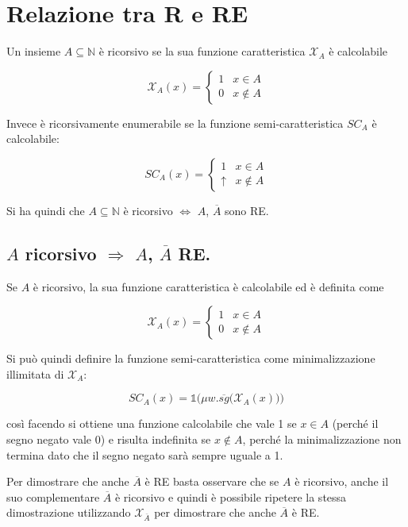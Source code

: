 \section{Relazione tra R e RE}

Un insieme $A \subseteq \mathbb{N}$ è ricorsivo se la sua funzione caratteristica $\mathcal{X}_A$ è calcolabile

$$
\mathcal{X}_A(x) = \begin{cases}
1 &x \in A \\
0 &x \notin A
\end{cases} 
$$

Invece è ricorsivamente enumerabile se la funzione semi-caratteristica $SC_A$ è calcolabile:

$$
SC_A(x) = \begin{cases}
1 &x \in A \\
\uparrow &x \notin A
\end{cases} 
$$

Si ha quindi che $A \subseteq \mathbb{N}$ è ricorsivo $\Leftrightarrow$ $A$, $\overline{A}$ sono RE.

\subsection{$A$ ricorsivo $\Rightarrow$ $A$, $\overline{A}$ RE. }

Se $A$ è ricorsivo, la sua funzione caratteristica è calcolabile ed è definita come

$$
\mathcal{X}_A(x) = \begin{cases}
1 &x \in A \\
0 &x \notin A
\end{cases} 
$$

Si può quindi definire la funzione semi-caratteristica come minimalizzazione illimitata di $\mathcal{X}_A$:

$$
SC_A(x) = \mathbb{1} \Bigg( \mu w. \overline{sg} \Big( \mathcal{X}_A(x) \Big) \Bigg)
$$

così facendo si ottiene una funzione calcolabile che vale 1 se $x \in A$ (perché il segno negato vale 0) e risulta indefinita se $x \notin A$, perché la minimalizzazione non termina dato che il segno negato sarà sempre uguale a 1.

Per dimostrare che anche $\overline{A}$ è RE basta osservare che se $A$ è ricorsivo, anche il suo complementare $\overline{A}$ è ricorsivo e quindi è possibile ripetere la stessa dimostrazione utilizzando $\mathcal{X}_{\overline{A}}$ per dimostrare che anche $\overline{A}$ è RE.

